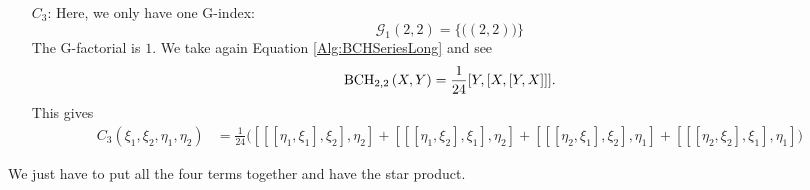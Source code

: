\begin{itemize}
	\item[$C_3$:]
	Here, we only have one G-index:
	\begin{equation*}
		\mathcal{G}_1(2,2) 
		=
		\big\{ 
			\big( (2,2) \big) 
		\big\}
	\end{equation*}
	The G-factorial is $1$. We take again Equation \eqref{Alg:BCHSeriesLong} 
	and see
	\begin{equation*}
		\mathrm{BCH}_{2, 2}\left(X, Y\right)
		=
		\frac{1}{24}
		[Y, [X, [Y, X]]].
	\end{equation*}
	This gives
	\begin{align*}
		C_3(\xi_1, \xi_2, \eta_1, \eta_2) 
		& = 
		\frac{1}{24}
		\big( 
			[[[\eta_1,\xi_1],\xi_2],\eta_2] + 
			[[[\eta_1,\xi_2],\xi_1],\eta_2] +
			[[[\eta_2,\xi_1],\xi_2],\eta_1] + 
			[[[\eta_2,\xi_2],\xi_1],\eta_1] 
		\big)
	\end{align*}
\end{itemize}
We just have to put all the four terms together and have the star product.


